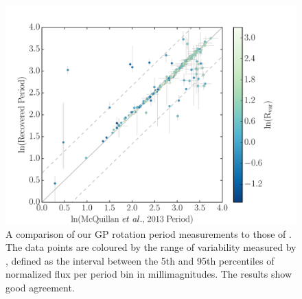 \documentclass[useAMS, usenatbib, preprint, 12pt]{aastex}
\newcommand{\Kepler}{{\it Kepler}}
\newcommand{\kepler}{\Kepler}
\begin{document}
\begin{figure}
\begin{center}
\includegraphics[width=6in, clip=true]{figures/comparison_koi.pdf}
\caption[Comparison with McQuillan results.]
{A comparison of our GP rotation period measurements to those of
\citet{Mcquillan2014}.
The data points are coloured by the range of variability measured by
    \citet{Mcquillan2014}, defined as the interval between the 5th and 95th
    percentiles of normalized flux per period bin in millimagnitudes.
    The results show good agreement.}
\label{fig:mcquillan}
\end{center}
\end{figure}

\end{document}
